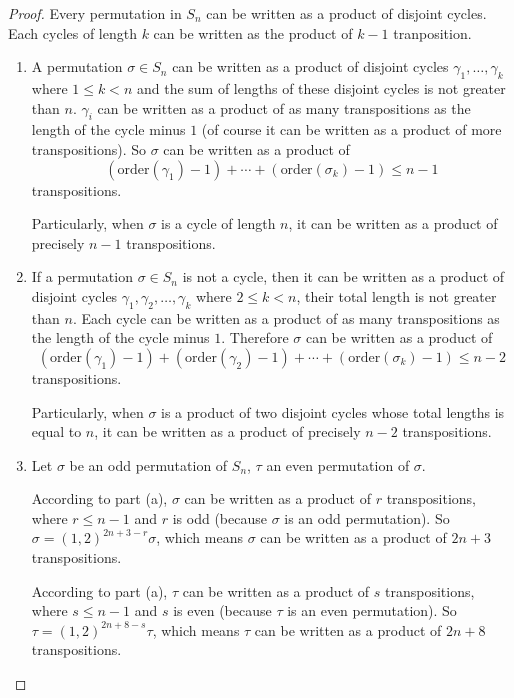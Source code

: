 \begin{proof}
    Every permutation in $S_{n}$ can be written as a product of disjoint cycles. Each cycles of length $k$ can be written as the product of $k-1$ tranposition.
    \begin{enumerate}[label={\textbf{\alph*.}}]
        \item A permutation $\sigma\in S_{n}$ can be written as a product of disjoint cycles $\gamma_{1},\ldots,\gamma_{k}$ where $1\leq k < n$ and the sum of lengths of these disjoint cycles is not greater than $n$. $\gamma_{i}$ can be written as a product of as many transpositions as the length of the cycle minus $1$ (of course it can be written as a product of more transpositions). So $\sigma$ can be written as a product of
              \[
                  (\text{order}(\gamma_{1}) - 1) + \cdots + (\text{order}(\sigma_{k}) - 1) \leq n - 1
              \]
              transpositions.

              Particularly, when $\sigma$ is a cycle of length $n$, it can be written as a product of precisely $n - 1$ transpositions.
        \item If a permutation $\sigma\in S_{n}$ is not a cycle, then it can be written as a product of disjoint cycles $\gamma_{1},\gamma_{2},\ldots,\gamma_{k}$ where $2\leq k < n$, their total length is not greater than $n$. Each cycle can be written as a product of as many transpositions as the length of the cycle minus $1$. Therefore $\sigma$ can be written as a product of
              \[
                  (\text{order}(\gamma_{1}) - 1) + (\text{order}(\gamma_{2}) - 1) + \cdots + (\text{order}(\sigma_{k}) - 1) \leq n - 2
              \]
              transpositions.

              Particularly, when $\sigma$ is a product of two disjoint cycles whose total lengths is equal to $n$, it can be written as a product of precisely $n - 2$ transpositions.
        \item Let $\sigma$ be an odd permutation of $S_{n}$, $\tau$ an even permutation of $\sigma$.

              According to part (a), $\sigma$ can be written as a product of $r$ transpositions, where $r \leq n - 1$ and $r$ is odd (because $\sigma$ is an odd permutation). So $\sigma = {(1,2)}^{2n + 3 - r}\sigma$, which means $\sigma$ can be written as a product of $2n + 3$ transpositions.

              According to part (a), $\tau$ can be written as a product of $s$ transpositions, where $s \leq n - 1$ and $s$ is even (because $\tau$ is an even permutation). So $\tau = {(1,2)}^{2n + 8 - s}\tau$, which means $\tau$ can be written as a product of $2n + 8$ transpositions.
    \end{enumerate}
\end{proof}

